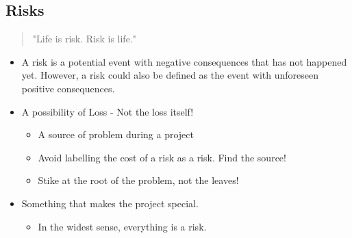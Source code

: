 \subsection{Risks}

\begin{quote}
    "Life is risk. Risk is life."
\end{quote}

\begin{definition}[Risk]
    \begin{itemize}
        \item A risk is a potential event with negative consequences that
            has not happened yet. However, a risk could also be defined as
            the event with unforeseen positive consequences.
        \item A possibility of Loss - Not the loss itself!
            \begin{itemize}
                \item A source of problem during a project
                \item Avoid labelling the cost of a risk as a risk. Find the source!
                \item Stike at the root of the problem, not the leaves!
            \end{itemize}
        \item Something that makes the project special.
            \begin{itemize}
                \item In the widest sense, everything is a risk.
            \end{itemize}
    \end{itemize}
\end{definition}


